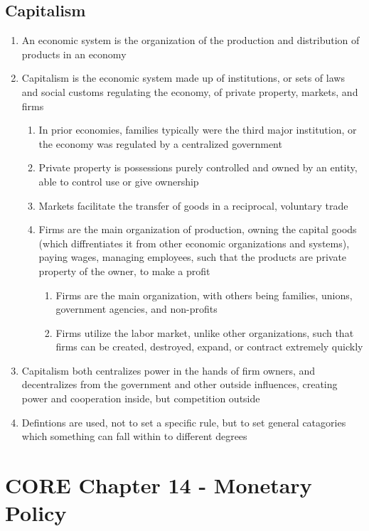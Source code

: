 \documentclass[11 pt, twoside]{article}
\begin{document}
\subsection{Capitalism}
\begin{enumerate}
\item An economic system is the organization of the production and distribution of products in an economy
\item Capitalism is the economic system made up of institutions, or sets of laws and social customs regulating the economy, of private property, markets, and firms
\begin{enumerate}
\item In prior economies, families typically were the third major institution, or the economy was regulated by a centralized government
\item Private property is possessions purely controlled and owned by an entity, able to control use or give ownership
\item Markets facilitate the transfer of goods in a reciprocal, voluntary trade
\item Firms are the main organization of production, owning the capital goods (which diffrentiates it from other economic organizations and systems), paying wages, managing employees, such that the products are private property of the owner, to make a profit
\begin{enumerate}
\item Firms are the main organization, with others being families, unions, government agencies, and non-profits
\item Firms utilize the labor market, unlike other organizations, such that firms can be created, destroyed, expand, or contract extremely quickly
\end{enumerate} 
\end{enumerate}
\item Capitalism both centralizes power in the hands of firm owners, and decentralizes from the government and other outside influences, creating power and cooperation inside, but competition outside
\item Defintions are used, not to set a specific rule, but to set general catagories which something can fall within to different degrees
\end{enumerate}

\section{CORE Chapter 14 - Monetary Policy}
\end{document}
